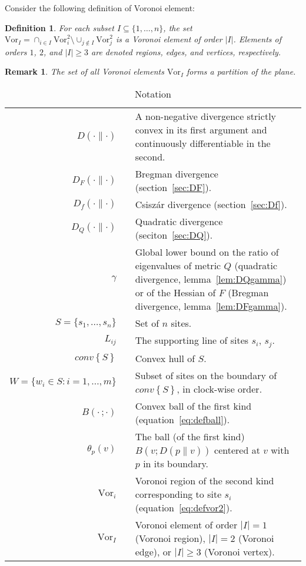 \documentclass[11pt]{article}
\newtheorem{definition}{Definition}
\newtheorem{remark}{Remark}
\newcommand{\Sites}{S}
\newcommand{\Vor}{\text{Vor}}
\newcommand{\D}[2]{D\left(#1 \parallel #2\right)}
\newcommand{\CHS}{{conv}\left\{\Sites\right\}}
\begin{document}
Consider the following definition of Voronoi element:
\begin{definition}\label{def:VorI}
	For each subset $I\subseteq\{1,\dots,n\}$, the set $\Vor_I=\cap_{i\in I}\Vor^2_i \setminus \cup_{j\not\in I}\Vor^2_j$ is a Voronoi element of order $|I|$. 
Elements of orders $1$, $2$, and $|I|\ge 3$ are denoted regions, edges, and vertices, respectively. 
\end{definition}
\begin{remark}
The set of all Voronoi elements $\Vor_I$ forms a partition of the plane. 
\end{remark}




\begin{table}[htbp]\caption{Notation}\label{table:notation}
\begin{center}
\begin{tabular}{r c p{11cm} }
\toprule
$\D{\cdot}{\cdot}$ && A non-negative divergence strictly convex in its first argument and continuously differentiable in the second. \\
$D_F(\cdot \parallel \cdot)$ && Bregman divergence (section~\ref{sec:DF}). \\
$D_f(\cdot \parallel \cdot)$ && Csisz\'ar divergence (section~\ref{sec:Df}).\\
$D_Q(\cdot \parallel \cdot)$ && Quadratic divergence (seciton~\ref{sec:DQ}).\\
$\gamma$ && Global lower bound on the ratio of eigenvalues 
	of metric $Q$ (quadratic divergence, lemma~\ref{lem:DQgamma}) 
	or of the Hessian of $F$ (Bregman divergence, lemma~\ref{lem:DFgamma}). \\
$\Sites = \{s_1,\dots,s_n\}$ && Set of $n$ sites. \\
$L_{ij}$ && The supporting line of sites $s_i$, $s_j$. \\
$\CHS$ && Convex hull of $\Sites$. \\
$W=\{w_i\in \Sites : i=1,\dots,m\}$ && Subset of sites on the boundary of $\CHS$, in clock-wise order. \\ $B(\cdot\, ;\cdot)$ && Convex ball of the first kind (equation~\eqref{eq:defball}). \\
$\theta_p(v)$ && The ball (of the first kind) $B(v;\D{p}{v})$  centered at $v$ with $p$ in its boundary. \\
$\Vor_i$ && Voronoi region of the second kind corresponding to site $s_i$ (equation~\eqref{eq:defvor2}). \\
$\Vor_I$ && Voronoi element of order $|I|=1$ (Voronoi region), $|I|=2$ (Voronoi edge), or $|I|\ge 3$ (Voronoi vertex).\\

\end{tabular}
\end{center}
\end{table}
\end{document}
